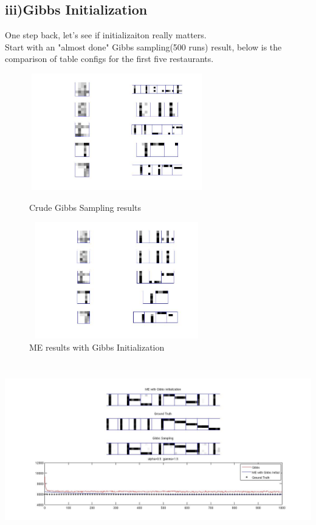 \documentclass{article}
\begin{document}
\begin{spacing}{1.1}
\subsection{iii)Gibbs Initialization}
One step back, let's see if initializaiton really matters.\\
Start with an "almost done" Gibbs sampling(500 runs) result, below is the comparison of table configs for the first five restaurants.\\
\begin{figure}[h] 
  \begin{minipage}[b]{0.5\textwidth} 
    \centering 
    \includegraphics[width=3in,height=2in]{gibb_part.jpg} 
    \caption{Crude Gibbs Sampling results} 
    \label{fig:by:table} 
  \end{minipage}%
  \begin{minipage}[b]{0.5\textwidth} 
    \centering 
    \includegraphics[width=3in,height=2in]{gibb_me_part.jpg} 
    \caption{ME results with Gibbs Initialization}
    \label{fig:by:table}  
   \end{minipage}%
\end{figure}
\begin{center}
    \includegraphics[width=6in,height=3in]{gibbs_end.jpg} 

\end{center}
\end{spacing}
\end{document}
